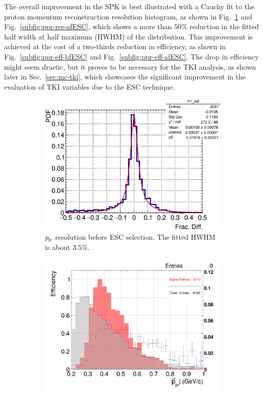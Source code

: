      The overall improvement in the SPK is best illustrated with a Cauchy fit to the proton momentum reconstruction resolution histogram, as shown in Fig.~\ref{subfig:ppr-res-bfESC} and Fig.~\ref{subfig:ppr-res-afESC}, which shows a more than $50\%$ reduction in the fitted half width at half maximum (HWHM) of the distribution.
     This improvement is achieved at the cost of a two-thirds reduction in efficiency, as shown in Fig.~\ref{subfig:ppr-eff-bfESC} and Fig.~\ref{subfig:ppr-eff-afESC}.
     The drop in efficiency might seem drastic, but it proves to be necessary for the TKI analysis, as shown later in Sec.~\ref{sec:mc-tki}, which showcases the significant improvement in the evaluation of TKI variables due to the ESC technique.

   \begin{figure}[t]
      \centering
      \begin{subfigure}{\dbfigwid\textwidth}
           \includegraphics[width=\textwidth]{figures/sel/p_pr_res_pdf_al13_zoom.eps}
           \caption{$p_\textrm{p}$ resolution before ESC selection. The fitted HWHM is about $3.5\%$.}
           \label{subfig:ppr-res-bfESC}
      \end{subfigure}
      \begin{subfigure}{\dbfigwid\textwidth}
           \includegraphics[width=\textwidth]{figures/sel/p_pr_eff_al13.png}

\end{subfigure}
\end{figure}
